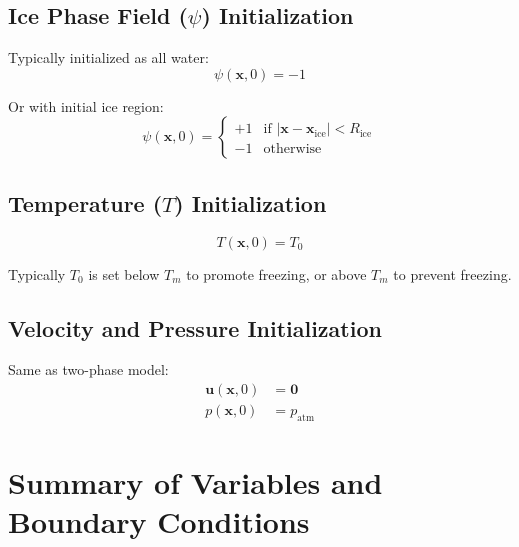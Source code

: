 \documentclass[12pt]{article}
\begin{document}
\subsection{Ice Phase Field ($\psi$) Initialization}

Typically initialized as all water:
\begin{equation}
\psi(\mathbf{x}, 0) = -1
\label{eq:initial_ice}
\end{equation}

Or with initial ice region:
\begin{equation}
\psi(\mathbf{x}, 0) = \begin{cases}
+1 & \text{if } |\mathbf{x} - \mathbf{x}_{\text{ice}}| < R_{\text{ice}} \\
-1 & \text{otherwise}
\end{cases}
\label{eq:initial_ice_region}
\end{equation}

\subsection{Temperature ($T$) Initialization}

\begin{equation}
T(\mathbf{x}, 0) = T_0
\label{eq:initial_temperature}
\end{equation}

Typically $T_0$ is set below $T_m$ to promote freezing, or above $T_m$ to prevent freezing.

\subsection{Velocity and Pressure Initialization}

Same as two-phase model:
\begin{align}
\mathbf{u}(\mathbf{x}, 0) &= \mathbf{0} \\
p(\mathbf{x}, 0) &= p_{\text{atm}}
\end{align}

\section{Summary of Variables and Boundary Conditions}
\end{document}
